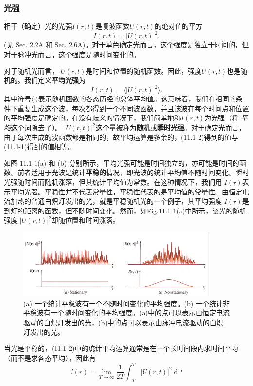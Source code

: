 \documentclass[UTF8]{ctexart}
\numberwithin{figure}{subsection}
\numberwithin{table}{subsection}
\DeclareMathOperator\dif{d\!}
\begin{document}
\subsubsection{光强}
\endgroup
相干（确定）光的光强$ I(r,t )$是复波函数$ U(r,t) $的绝对值的平方
\begin{equation}
I(r,t) = \lvert U(r,t) \rvert ^2 .
\end{equation}
(见 Sec. 2.2A 和 Sec. 2.6A)。对于单色确定光而言，这个强度是独立于时间的，但对于脉冲光而言，这个强度是随时间变化的。
\par 对于随机光而言， $ U(r,t) $是时间和位置的随机函数。因此，强度$ U(r,t) $也是随机的。我们定义\textbf{平均光强}为
\begin{equation}
I(r,t) = \langle \lvert U(r,t) \rvert ^2 \rangle .
\end{equation}
其中符号$ \langle \cdot \rangle $表示随机函数的各态历经的总体平均值。这意味着，我们在相同的条件下重复生成这个波，每次都得到一个不同波函数，并且该波在每个时间点和位置的平均强度是确定的。在没有歧义的情况下，我们简单地称$ I(r,t) $为光强（将 \textsl{平均}这个词隐去了）。  $ \lvert U(r,t) \rvert ^2 $这个量被称为\textbf{随机}或\textbf{瞬时光强}。对于确定光而言，由于每次生成的波函数都是相同的，故平均运算是多余的，(11.1-2)得到的值与(11.1-1)得到的值相等。
\par 如图 11.1-1(a) 和 (b) 分别所示，平均光强可能是时间独立的，亦可能是时间的函数。前者适用于光波是统计\textbf{平稳的}情况，即光波的统计平均值不随时间变化。瞬时光强随时间而随机涨落，但其统计平均值为常数。在这种情况下，我们用 $ I(r) $表示平均光强。平稳性并不代表常量性，平稳性代表的是平均值的常量性。由恒定电流加热的普通白炽灯发出的光，就是平稳随机光的一个例子，其平均强度 $ I(r) $是到灯的距离的函数，但不随时间变化。然而，如Fig.11.1-1(a)中所示，该光的随机强度 $ \lvert U(r,t) \rvert ^2 $却随位置和时间涨落。
\begin{figure}[ht]
\centering
\includegraphics[width=0.9\textwidth]{11_1_1.PNG}
\caption{(a) 一个统计平稳波有一个不随时间变化的平均强度。(b) 一个统计非平稳波有一个随时间变化的平均强度。(a)中的点可以表示由恒定电流驱动的白炽灯发出的光，(b)中的点可以表示由脉冲电流驱动的白炽灯发出的光。}
\label{fig: 11_1_1}
\end{figure}
\par 当光是平稳的，(11.1-2)中的统计平均运算通常是在一个长时间段内求时间平均（而不是求各态平均），因此有
\begin{equation}
I(r) = \lim_{T\to\infty}\frac{1}{2T} \int_{-T}^T \lvert U(r,t) \rvert ^2 \dif t
\end{equation}
\end{document}

